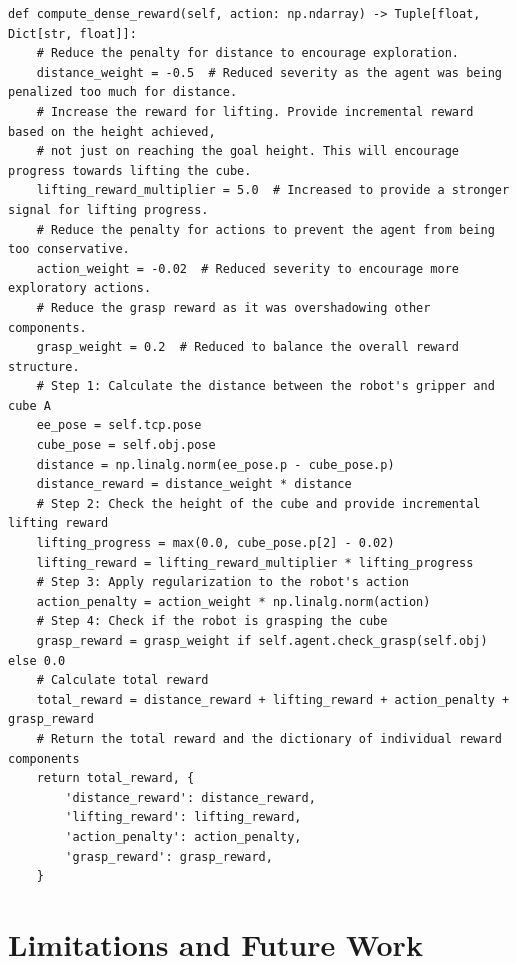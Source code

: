 \documentclass{article}
\theoremstyle{plain}
\theoremstyle{definition}
\theoremstyle{remark}
\begin{document}
\begin{table}[!ht]
\begin{tcolorbox}
\begin{lstlisting}[breaklines]
def compute_dense_reward(self, action: np.ndarray) -> Tuple[float, Dict[str, float]]:
    # Reduce the penalty for distance to encourage exploration.
    distance_weight = -0.5  # Reduced severity as the agent was being penalized too much for distance.
    # Increase the reward for lifting. Provide incremental reward based on the height achieved,
    # not just on reaching the goal height. This will encourage progress towards lifting the cube.
    lifting_reward_multiplier = 5.0  # Increased to provide a stronger signal for lifting progress.
    # Reduce the penalty for actions to prevent the agent from being too conservative.
    action_weight = -0.02  # Reduced severity to encourage more exploratory actions.
    # Reduce the grasp reward as it was overshadowing other components.
    grasp_weight = 0.2  # Reduced to balance the overall reward structure.
    # Step 1: Calculate the distance between the robot's gripper and cube A
    ee_pose = self.tcp.pose
    cube_pose = self.obj.pose
    distance = np.linalg.norm(ee_pose.p - cube_pose.p)
    distance_reward = distance_weight * distance
    # Step 2: Check the height of the cube and provide incremental lifting reward
    lifting_progress = max(0.0, cube_pose.p[2] - 0.02)
    lifting_reward = lifting_reward_multiplier * lifting_progress
    # Step 3: Apply regularization to the robot's action
    action_penalty = action_weight * np.linalg.norm(action)
    # Step 4: Check if the robot is grasping the cube
    grasp_reward = grasp_weight if self.agent.check_grasp(self.obj) else 0.0
    # Calculate total reward
    total_reward = distance_reward + lifting_reward + action_penalty + grasp_reward
    # Return the total reward and the dictionary of individual reward components
    return total_reward, {
        'distance_reward': distance_reward,
        'lifting_reward': lifting_reward,
        'action_penalty': action_penalty,
        'grasp_reward': grasp_reward,
    }
\end{lstlisting}
\end{tcolorbox}
\label{tab:iterative_process_on_liftcube_3}
\end{table}


\section{Limitations and Future Work}
\end{document}
